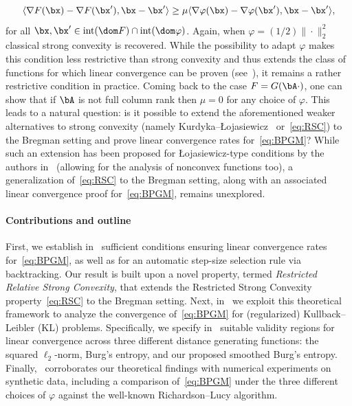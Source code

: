 \documentclass[11pt]{amsart}
\begin{document}
\begin{equation}\label{eq:breg_rsc}
\langle \nabla F(\bx)-\nabla F(\bx'), \bx-\bx'\rangle\geq\mu\langle \nabla \varphi(\bx)-\nabla \varphi(\bx'), \bx-\bx'\rangle,
\end{equation}
for all $\bx,\bx'\in\mathrm{int}(\dom F)\cap\mathrm{int}(\dom \varphi)$. Again, when $\varphi=(1/2)\|\cdot\|_2^2$ classical strong convexity is recovered. While the possibility to adapt $\varphi$ makes this condition less restrictive than strong convexity and thus extends the class of functions for which linear convergence can be proven (see~\cite[Section 2]{lu2018relatively}), it remains a rather restrictive condition in practice. Coming back to the case  $F = G(\bA \cdot)$, 
one can show
that if $\bA$ is not full column rank then $\mu = 0$ for any choice of $\varphi$. This leads to a natural question: is it possible to extend the aforementioned weaker alternatives to strong convexity (namely Kurdyka--{\L}ojasiewicz \ or~\cref{eq:RSC}) to the Bregman setting and prove linear convergence rates for~\cref{eq:BPGM}? While such an extension has been proposed for {\L}ojasiewicz-type conditions by the authors in~\cite{Bauschke2019} (allowing for the analysis of nonconvex functions too), a generalization of~\cref{eq:RSC} to the Bregman setting, along with an associated linear convergence proof for~\cref{eq:BPGM}, remains unexplored.\\

\paragraph{\textbf{Contributions and outline}}
First, we establish in~ sufficient conditions ensuring linear convergence rates for~\cref{eq:BPGM}, as well as for an automatic step-size selection rule via backtracking. Our result is built upon a novel property, termed \emph{Restricted Relative Strong Convexity}, that extends the Restricted Strong Convexity property~\cref{eq:RSC} to the Bregman setting. Next, in~ we exploit this theoretical framework to analyze the convergence of~\cref{eq:BPGM} for (regularized) Kullback--Leibler (KL) problems. Specifically, we specify in~ suitable validity regions for linear convergence across three different distance generating functions: the squared $\ell_2$-norm, Burg's entropy, and our proposed smoothed Burg's entropy. Finally,~ corroborates our theoretical findings with numerical experiments on synthetic data, including a comparison of~\cref{eq:BPGM} under the three different choices of $\varphi$ against the well-known Richardson--Lucy algorithm.\\
\end{document}
